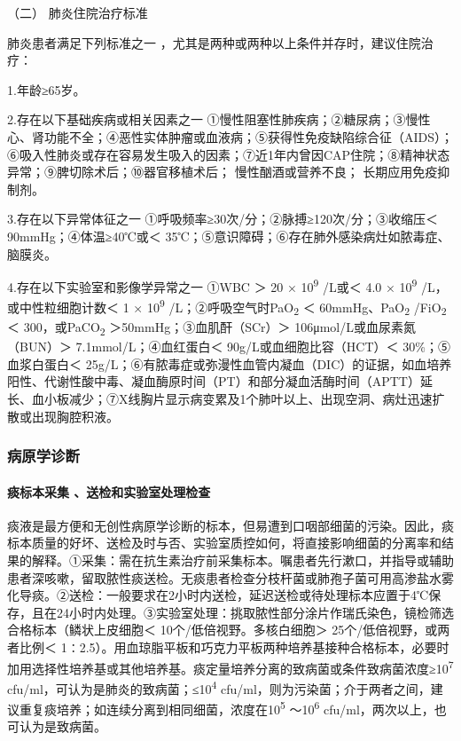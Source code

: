 \hypertarget{text00272.htmlux5cux23CHP9-5-2-2-2}{}
（二） 肺炎住院治疗标准

肺炎患者满足下列标准之一
，尤其是两种或两种以上条件并存时，建议住院治疗：

1.年龄≥65岁。

2.存在以下基础疾病或相关因素之一
①慢性阻塞性肺疾病；②糖尿病；③慢性心、肾功能不全；④恶性实体肿瘤或血液病；⑤获得性免疫缺陷综合征（AIDS）；⑥吸入性肺炎或存在容易发生吸入的因素；⑦近1年内曾因CAP住院；⑧精神状态异常；⑨脾切除术后；⑩器官移植术后；{}
慢性酗酒或营养不良；{} 长期应用免疫抑制剂。

3.存在以下异常体征之一 ①呼吸频率≥30次/分；②脉搏≥120次/分；③收缩压＜
90mmHg；④体温≥40℃或＜
35℃；⑤意识障碍；⑥存在肺外感染病灶如脓毒症、脑膜炎。

4.存在以下实验室和影像学异常之一 ①WBC ＞ 20 × 10\textsuperscript{9}
/L或＜ 4.0 × 10\textsuperscript{9} /L，或中性粒细胞计数＜ 1 ×
10\textsuperscript{9} /L；②呼吸空气时PaO\textsubscript{2} ＜
60mmHg、PaO\textsubscript{2} /FiO\textsubscript{2} ＜
300，或PaCO\textsubscript{2} ＞50mmHg；③血肌酐（SCr）＞
106μmol/L或血尿素氮（BUN）＞ 7.1mmol/L；④血红蛋白＜
90g/L或血细胞比容（HCT）＜ 30\%；⑤血浆白蛋白＜
25g/L；⑥有脓毒症或弥漫性血管内凝血（DIC）的证据，如血培养阳性、代谢性酸中毒、凝血酶原时间（PT）和部分凝血活酶时间（APTT）延长、血小板减少；⑦X线胸片显示病变累及1个肺叶以上、出现空洞、病灶迅速扩散或出现胸腔积液。

\subsubsection{病原学诊断}

\paragraph{痰标本采集 、送检和实验室处理检查}

痰液是最方便和无创性病原学诊断的标本，但易遭到口咽部细菌的污染。因此，痰标本质量的好坏、送检及时与否、实验室质控如何，将直接影响细菌的分离率和结果的解释。①采集：需在抗生素治疗前采集标本。嘱患者先行漱口，并指导或辅助患者深咳嗽，留取脓性痰送检。无痰患者检查分枝杆菌或肺孢子菌可用高渗盐水雾化导痰。②送检：一般要求在2小时内送检，延迟送检或待处理标本应置于4℃保存，且在24小时内处理。③实验室处理：挑取脓性部分涂片作瑞氏染色，镜检筛选合格标本（鳞状上皮细胞＜
10个/低倍视野。多核白细胞＞ 25个/低倍视野，或两者比例＜
1∶2.5）。用血琼脂平板和巧克力平板两种培养基接种合格标本，必要时加用选择性培养基或其他培养基。痰定量培养分离的致病菌或条件致病菌浓度≥10\textsuperscript{7}
cfu/ml，可认为是肺炎的致病菌；≤10\textsuperscript{4}
cfu/ml，则为污染菌；介于两者之间，建议重复痰培养；如连续分离到相同细菌，浓度在10\textsuperscript{5}
～10\textsuperscript{6} cfu/ml，两次以上，也可认为是致病菌。

